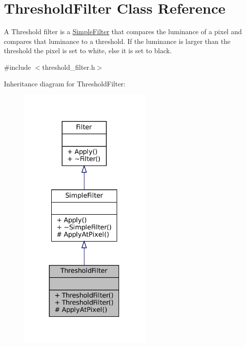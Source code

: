 \hypertarget{classThresholdFilter}{}\section{Threshold\+Filter Class Reference}
\label{classThresholdFilter}


A Threshold filter is a \hyperlink{classSimpleFilter}{Simple\+Filter} that compares the luminance of a pixel and compares that luminance to a threshold. If the luminance is larger than the threshold the pixel is set to white, else it is set to black.  




{\ttfamily \#include $<$threshold\+\_\+filter.\+h$>$}



Inheritance diagram for Threshold\+Filter\+:\nopagebreak
\begin{figure}[H]
\begin{center}
\leavevmode
\includegraphics[width=187pt]{classThresholdFilter__inherit__graph}
\end{center}
\end{figure}


